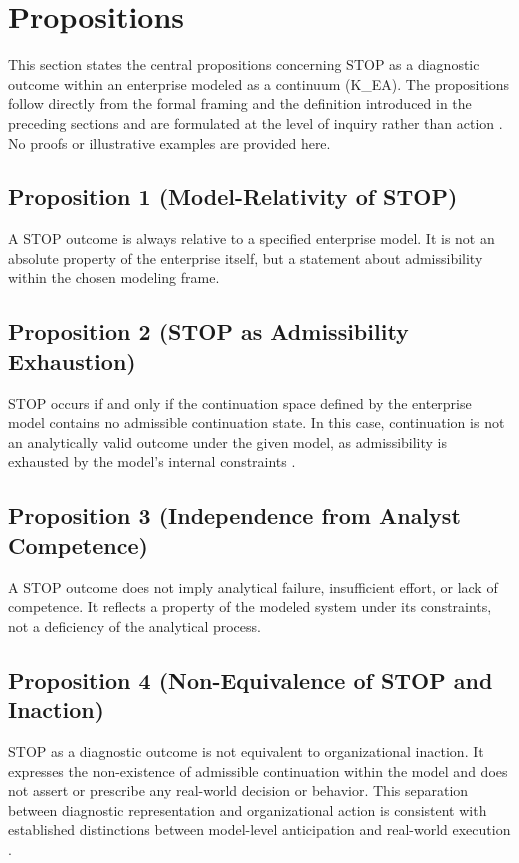 ﻿\section{Propositions}

This section states the central propositions concerning STOP as a diagnostic outcome within an enterprise modeled as a continuum (K\_EA). The propositions follow directly from the formal framing and the definition introduced in the preceding sections and are formulated at the level of inquiry rather than action \cite{churchman1971}. No proofs or illustrative examples are provided here.

\subsection*{Proposition 1 (Model-Relativity of STOP)}
A STOP outcome is always relative to a specified enterprise model. It is not an absolute property of the enterprise itself, but a statement about admissibility within the chosen modeling frame.

\subsection*{Proposition 2 (STOP as Admissibility Exhaustion)}
STOP occurs if and only if the continuation space defined by the enterprise model contains no admissible continuation state. In this case, continuation is not an analytically valid outcome under the given model, as admissibility is exhausted by the model’s internal constraints \cite{ashby1956}.

\subsection*{Proposition 3 (Independence from Analyst Competence)}
A STOP outcome does not imply analytical failure, insufficient effort, or lack of competence. It reflects a property of the modeled system under its constraints, not a deficiency of the analytical process.

\subsection*{Proposition 4 (Non-Equivalence of STOP and Inaction)}
STOP as a diagnostic outcome is not equivalent to organizational inaction. It expresses the non-existence of admissible continuation within the model and does not assert or prescribe any real-world decision or behavior. This separation between diagnostic representation and organizational action is consistent with established distinctions between model-level anticipation and real-world execution \cite{rosen1985}.

